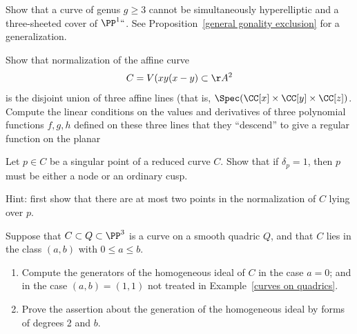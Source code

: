 \begin{exercise}\label{gonality exclusion}
Show that a curve of genus $g \geq 3$ cannot be simultaneously hyperelliptic and a three-sheeted cover of $\PP^1` `$.
See Proposition~\ref{general gonality exclusion} for a generalization.
\end{exercise}

\begin{exercise}\label{planar triple pt}
Show that normalization of the affine curve 
$$C = V(xy(x-y) \subset \AA^2$$ 
is the disjoint union of three
affine lines (that is, $\Spec(\CC[x] \times \CC[y]\times \CC[z])$. Compute the linear conditions on the values and derivatives of three polynomial functions $f,g,h$ defined on
these three lines that they ``descend'' to give a regular function on
the planar 
%
\end{exercise}

%

\begin{exercise}\label{delta=1 characterization}
Let $p \in C$ be a singular point of a reduced curve $C$. Show that if $\delta_p = 1$, then $p$ must be either a node or an ordinary cusp.

Hint: first show that there are at most two points in the normalization of $C$ lying over $p$.
\end{exercise}

\begin{exercise}\label{curve on rank 4 quadric}
 Suppose that $C\subset Q\subset \PP^{3}$ is a curve on a smooth quadric $Q$, and that $C$ lies
 in the class $(a,b)$ with $0\leq a\leq b$.
 
\begin{enumerate}
 \item Compute the generators of the homogeneous ideal of $C$ in the case $a=0$; and in the case
 $(a,b) = (1,1)$ not treated in Example~\ref{curves on quadrics}.
 \item Prove the assertion  
about the generation of the homogeneous ideal by forms of degrees 2 and $b$.
\end{enumerate}
\end{exercise}

